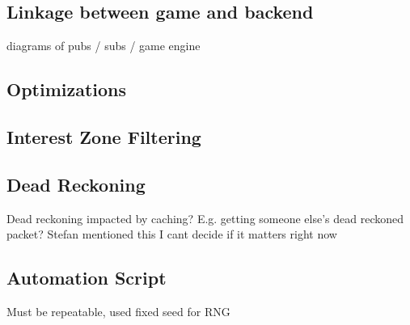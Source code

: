 \subsection{Linkage between game and backend}
diagrams of pubs / subs / game engine
\subsection{Optimizations}
\subsection*{Interest Zone Filtering}
\subsection*{Dead Reckoning}
Dead reckoning impacted by caching? E.g. getting someone else's dead reckoned packet? Stefan mentioned this I cant decide if it matters right now

\subsection{Automation Script}
Must be repeatable, used fixed seed for RNG